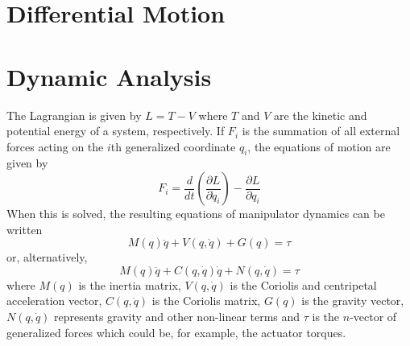 \documentclass[11pt]{book}
\theoremstyle{example}
\begin{document}
\section{Differential Motion}

\section{Dynamic Analysis}

The Lagrangian is given by $L=T-V$ where $T$ and $V$ are the kinetic and potential energy of a system, respectively. If $F_i$ is the summation of all external forces acting on the $i$th generalized coordinate $q_i$, the equations of motion are given by
\begin{equation}
	F_i=\frac{d}{dt}\left(\frac{\partial{L}}{\partial\dot{q}_i}\right)-\frac{\partial{L}}{\partial{q_i}}
\end{equation}
When this is solved, the resulting equations of manipulator dynamics can be written
\begin{equation}
	M(q)\ddot{q}+V(q,\dot{q})+G(q)=\tau
\end{equation}
or, alternatively,
\begin{equation}
	M(q)\ddot{q}+C(q,\dot{q})\dot{q}+N(q,\dot{q})=\tau
\end{equation}
where $M(q)$ is the inertia matrix, $V(q,\dot{q})$ is the Coriolis and centripetal acceleration vector, $C(q,\dot{q})$ is the Coriolis matrix, $G(q)$ is the gravity vector, $N(q,\dot{q})$ represents gravity and other non-linear terms and $\tau$ is the $n$-vector of generalized forces which could be, for example, the actuator torques.
\end{document}
